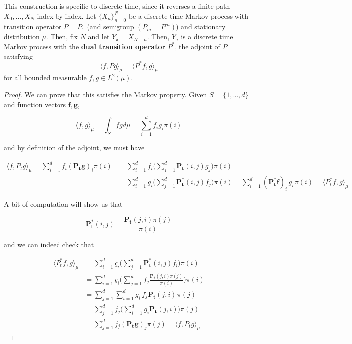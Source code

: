 	\begin{definition}
		\label{def:reversed-markov-process}
		This construction is specific to discrete time, since it reverses a finite path $X_0, \ldots, X_N$ index by index. Let $\{X_n\}_{n=0}^N$ be a discrete time Markov process with transition operator $P = P_1$ (and semigroup $(P_m = P^m)$) and stationary distribution $\mu$. Then, fix $N$ and let $Y_n = X_{N - n}$. Then, $Y_n$ is a discrete time Markov process with the \textbf{dual transition operator} $P^*$, the adjoint of $P$ satisfying 
		\begin{equation}
			\langle f, P g \rangle_\mu = \langle P^* f, g \rangle_\mu
		\end{equation}
		for all bounded measurable $f, g \in L^2 (\mu)$. 
	\end{definition}
	\begin{proof}
		We can prove that this satisfies the Markov property. Given $S = \{1, \ldots, d\}$ and function vectors $\mathbf{f}, \mathbf{g}$, 

			\begin{equation}
				\langle f, g \rangle_\mu = \int_S f g d\mu = \sum_{i=1}^d f_i g_i \pi(i)
			\end{equation}

		and by definition of the adjoint, we must have 

		\begin{align*}
			\langle f, P_t g \rangle_\mu = \sum_{i=1}^d f_i (\mathbf{P_t} \mathbf{g})_i \pi(i) & = \sum_{i=1}^d f_i \bigg( \sum_{j=1}^d \mathbf{P_t}(i, j) g_j \bigg) \pi(i) \\
			& = \sum_{i=1}^d g_i \bigg( \sum_{j=1}^d \mathbf{P_t^*} (i, j) f_j \bigg) \pi(i) = \sum_{i=1}^d (\mathbf{P_t^*} \mathbf{f})_i \, g_i \, \pi(i) = \langle P_t^* f, g \rangle_\mu 
		\end{align*}

		A bit of computation will show us that 

			\begin{equation}
				\mathbf{P_t^*}(i, j) = \frac{\mathbf{P_t}(j, i) \pi(j)}{\pi(i)}
			\end{equation}

		and we can indeed check that 

		\begin{align*}
			\langle P_t^* f, g \rangle_\mu  & = \sum_{i=1}^d g_i \bigg( \sum_{j=1}^d \mathbf{P_t^*} (i, j) f_j \bigg) \pi(i) \\
			& = \sum_{i=1}^d g_i \bigg( \sum_{j=1}^d f_j \frac{\mathbf{P_t}(j, i) \pi(j)}{\pi(i)} \bigg) \pi(i) \\
			& = \sum_{j=1}^d \sum_{i=1}^d g_i \, f_j \mathbf{P_t}(j, i) \, \pi(j) \\
			& = \sum_{j=1}^d f_j \bigg( \sum_{i=1}^d g_i \mathbf{P_t}(j, i) \bigg) \pi(j) \\
			& = \sum_{j=1}^d f_j (\mathbf{P_t} \mathbf{g})_j \pi(j) = \langle f, P_t g \rangle_\mu
		\end{align*}


\end{proof}
